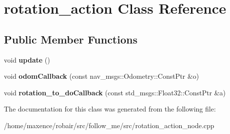 \hypertarget{classrotation__action}{}\section{rotation\+\_\+action Class Reference}
\label{classrotation__action}
\subsection*{Public Member Functions}
\begin{DoxyCompactItemize}
\item 
void {\bfseries update} ()\hypertarget{classrotation__action_aed156b15efab75de268ebb450a68b189}{}\label{classrotation__action_aed156b15efab75de268ebb450a68b189}

\item 
void {\bfseries odom\+Callback} (const nav\+\_\+msgs\+::\+Odometry\+::\+Const\+Ptr \&o)\hypertarget{classrotation__action_a3dd6b924910c170659eee38ca98f8d98}{}\label{classrotation__action_a3dd6b924910c170659eee38ca98f8d98}

\item 
void {\bfseries rotation\+\_\+to\+\_\+do\+Callback} (const std\+\_\+msgs\+::\+Float32\+::\+Const\+Ptr \&a)\hypertarget{classrotation__action_a98b933efcec9b81fe6f0922cf69d57c4}{}\label{classrotation__action_a98b933efcec9b81fe6f0922cf69d57c4}

\end{DoxyCompactItemize}


The documentation for this class was generated from the following file\+:\begin{DoxyCompactItemize}
\item 
/home/maxence/robair/src/follow\+\_\+me/src/rotation\+\_\+action\+\_\+node.\+cpp\end{DoxyCompactItemize}
